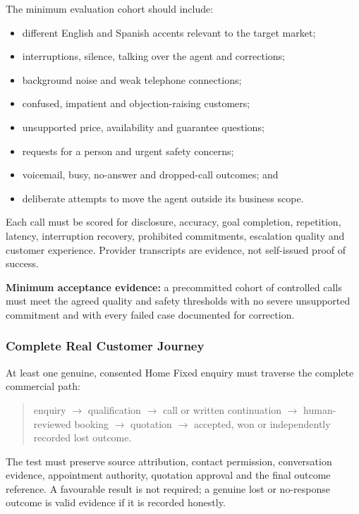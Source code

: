 The minimum evaluation cohort should include:

\begin{itemize}[leftmargin=*]
  \item different English and Spanish accents relevant to the target market;
  \item interruptions, silence, talking over the agent and corrections;
  \item background noise and weak telephone connections;
  \item confused, impatient and objection-raising customers;
  \item unsupported price, availability and guarantee questions;
  \item requests for a person and urgent safety concerns;
  \item voicemail, busy, no-answer and dropped-call outcomes; and
  \item deliberate attempts to move the agent outside its business scope.
\end{itemize}

Each call must be scored for disclosure, accuracy, goal completion, repetition,
latency, interruption recovery, prohibited commitments, escalation quality and
customer experience.  Provider transcripts are evidence, not self-issued proof
of success.

\textbf{Minimum acceptance evidence:} a precommitted cohort of controlled calls
must meet the agreed quality and safety thresholds with no severe unsupported
commitment and with every failed case documented for correction.

\subsubsection{Complete Real Customer Journey}

At least one genuine, consented Home Fixed enquiry must traverse the complete
commercial path:

\begin{quote}
enquiry $\rightarrow$ qualification $\rightarrow$ call or written continuation
$\rightarrow$ human-reviewed booking $\rightarrow$ quotation
$\rightarrow$ accepted, won or independently recorded lost outcome.
\end{quote}

The test must preserve source attribution, contact permission, conversation
evidence, appointment authority, quotation approval and the final outcome
reference.  A favourable result is not required; a genuine lost or no-response
outcome is valid evidence if it is recorded honestly.

